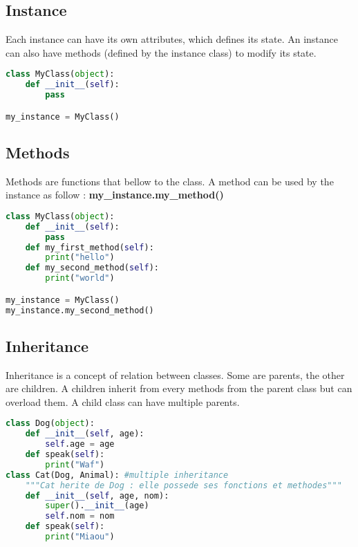 \documentclass[a4paper, 12pt, titlepage]{scrartcl} %
\begin{document}
\subsection{Instance}
Each instance can have its own attributes, which defines its state. An instance can also have methods (defined by the instance class) to modify its state.
\begin{lstlisting}[language=Python]
class MyClass(object):
	def __init__(self):
		pass

my_instance = MyClass()
\end{lstlisting}

\subsection{Methods}
Methods are functions that bellow to the class. A method can be used by the instance as follow  : \textbf{my\_instance.my\_method()}
\begin{lstlisting}[language=Python]
class MyClass(object):
	def __init__(self):
		pass
	def my_first_method(self):
	    print("hello")
	def my_second_method(self):
	    print("world")

my_instance = MyClass()
my_instance.my_second_method()
\end{lstlisting}

\subsection{Inheritance}
Inheritance is a concept of relation between classes. Some are parents, the other are children. A children inherit from every methods from the parent class but can overload them. A child class can have multiple parents.
\begin{lstlisting}[language=Python]
class Dog(object):
	def __init__(self, age):
		self.age = age
	def speak(self):
		print("Waf")
class Cat(Dog, Animal): #multiple inheritance
	"""Cat herite de Dog : elle possede ses fonctions et methodes"""
	def __init__(self, age, nom):
		super().__init__(age)
		self.nom = nom
	def speak(self):
		print("Miaou")
\end{lstlisting}
\end{document}
